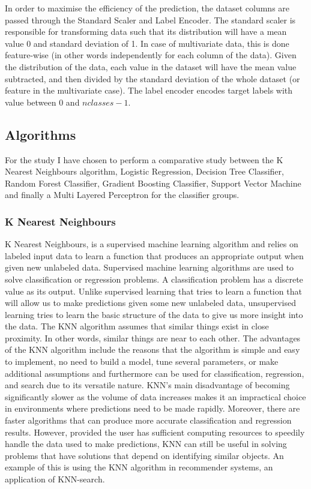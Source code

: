 \documentclass[12pt]{article}
\begin{document}
In order to maximise the efficiency of the prediction, the dataset columns are passed through the Standard Scaler\cite{scikit1} and Label Encoder\cite{scikit2}. The standard scaler is responsible for transforming data such that its distribution will have a mean value 0 and standard deviation of 1. In case of multivariate data, this is done feature-wise (in other words independently for each column of the data). Given the distribution of the data, each value in the dataset will have the mean value subtracted, and then divided by the standard deviation of the whole dataset (or feature in the multivariate case). The label encoder encodes target labels with value between $0$ and $nclasses-1$.



\newpage
\subsection{Algorithms}


For the study I have chosen to perform a comparative study between the K Nearest Neighbours algorithm, Logistic Regression, Decision Tree Classifier, Random Forest Classifier, Gradient Boosting Classifier, Support Vector Machine and finally a Multi Layered Perceptron for the classifier groups.


\subsubsection{K Nearest Neighbours}

K Nearest Neighbours, is a supervised machine learning algorithm and relies on labeled input data to learn a function that produces an appropriate output when given new unlabeled data. Supervised machine learning algorithms are used to solve classification or regression problems. A classification problem has a discrete value as its output. Unlike supervised learning that tries to learn a function that will allow us to make predictions given some new unlabeled data, unsupervised learning tries to learn the basic structure of the data to give us more insight into the data. The KNN algorithm assumes that similar things exist in close proximity. In other words, similar things are near to each other. The advantages of the KNN algorithm include the reasons that the algorithm is simple and easy to implement, no need to build a model, tune several parameters, or make additional assumptions and furthermore can be used for classification, regression, and search due to its versatile nature. KNN’s main disadvantage of becoming significantly slower as the volume of data increases makes it an impractical choice in environments where predictions need to be made rapidly. Moreover, there are faster algorithms that can produce more accurate classification and regression results.
However, provided the user has sufficient computing resources to speedily handle the data used to make predictions, KNN can still be useful in solving problems that have solutions that depend on identifying similar objects. An example of this is using the KNN algorithm in recommender systems, an application of KNN-search.
\end{document}
